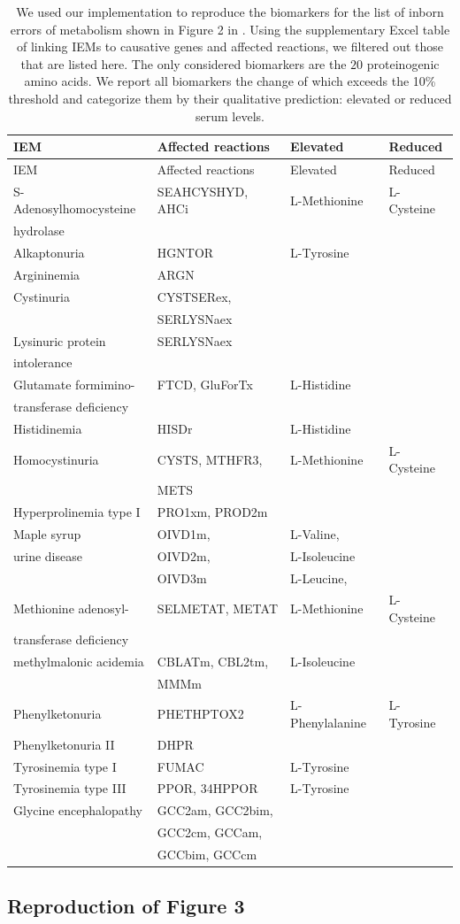 \documentclass[10pt,a4paper,onecolumn]{article}
\begin{document}
\hypertarget{tbl:amino_acid_iems}{}
\begin{longtable}[]{@{}llll@{}}
\caption{\label{tbl:amino_acid_iems}We used our implementation to
reproduce the biomarkers for the list of inborn errors of metabolism
shown in Figure 2 in \autocite{Shlomi2009}. Using the supplementary
Excel table of \autocite{Shlomi2009} linking IEMs to causative genes and
affected reactions, we filtered out those that are listed here. The only
considered biomarkers are the \(20\) proteinogenic amino acids. We
report all biomarkers the change of which exceeds the 10\% threshold and
categorize them by their qualitative prediction: elevated or reduced
serum levels. }\tabularnewline
\toprule
IEM & Affected reactions & Elevated & Reduced\tabularnewline
\midrule
\endfirsthead
\toprule
IEM & Affected reactions & Elevated & Reduced\tabularnewline
\midrule
\endhead
S-Adenosylhomocysteine & SEAHCYSHYD, AHCi & L-Methionine &
L-Cysteine\tabularnewline
hydrolase & & &\tabularnewline
Alkaptonuria & HGNTOR & L-Tyrosine &\tabularnewline
Argininemia & ARGN & &\tabularnewline
Cystinuria & CYSTSERex, & &\tabularnewline
& SERLYSNaex & &\tabularnewline
Lysinuric protein & SERLYSNaex & &\tabularnewline
intolerance & & &\tabularnewline
Glutamate formimino- & FTCD, GluForTx & L-Histidine &\tabularnewline
transferase deficiency & & &\tabularnewline
Histidinemia & HISDr & L-Histidine &\tabularnewline
Homocystinuria & CYSTS, MTHFR3, & L-Methionine &
L-Cysteine\tabularnewline
& METS & &\tabularnewline
Hyperprolinemia type I & PRO1xm, PROD2m & &\tabularnewline
Maple syrup & OIVD1m, & L-Valine, &\tabularnewline
urine disease & OIVD2m, & L-Isoleucine &\tabularnewline
& OIVD3m & L-Leucine, &\tabularnewline
Methionine adenosyl- & SELMETAT, METAT & L-Methionine &
L-Cysteine\tabularnewline
transferase deficiency & & &\tabularnewline
methylmalonic acidemia & CBLATm, CBL2tm, & L-Isoleucine &\tabularnewline
& MMMm & &\tabularnewline
Phenylketonuria & PHETHPTOX2 & L-Phenylalanine &
L-Tyrosine\tabularnewline
Phenylketonuria II & DHPR & &\tabularnewline
Tyrosinemia type I & FUMAC & L-Tyrosine &\tabularnewline
Tyrosinemia type III & PPOR, 34HPPOR & L-Tyrosine &\tabularnewline
Glycine encephalopathy & GCC2am, GCC2bim, & &\tabularnewline
& GCC2cm, GCCam, & &\tabularnewline
& GCCbim, GCCcm & &\tabularnewline
\bottomrule
\end{longtable}

\subsection{\texorpdfstring{Reproduction of Figure 3
\autocite{Shlomi2009}}{Reproduction of Figure 3 {[}@Shlomi2009{]}}}\label{reproduction-of-figure-3-shlomi2009}
\end{document}
